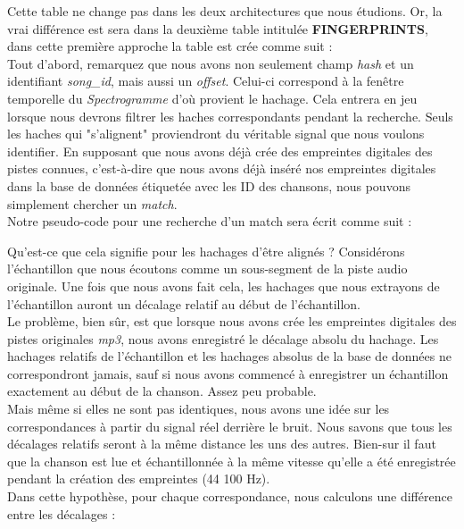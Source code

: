 \documentclass[11pt, report, french]{scrreprt}
\begin{document}


\vspace{0.5cm}
Cette table ne change pas dans les deux architectures que nous étudions. Or, la vrai différence est sera dans la deuxième table intitulée \textbf{FINGERPRINTS}, dans cette première approche la table est crée comme suit :\\



\vspace{0.5cm}
Tout d'abord, remarquez que nous avons non seulement champ \textit{hash} et un identifiant \textit{song\_id}, mais aussi un \textit{offset}. Celui-ci correspond à la fenêtre temporelle du \textit{Spectrogramme} d'où provient le hachage. Cela entrera en jeu lorsque nous devrons filtrer les haches correspondants pendant la recherche. Seuls les haches qui "s'alignent" proviendront du véritable signal que nous voulons identifier.
En supposant que nous avons déjà crée des empreintes digitales des pistes connues, c'est-à-dire que nous avons déjà inséré nos empreintes digitales dans la base de données étiquetée avec les ID des chansons, nous pouvons simplement chercher un \textit{match}.\\

Notre pseudo-code pour une recherche d'un match sera écrit comme suit :



\vspace{0.5cm}
Qu'est-ce que cela signifie pour les hachages d'être alignés ? Considérons l'échantillon que nous écoutons comme un sous-segment de la piste audio originale. Une fois que nous avons fait cela, les hachages que nous extrayons de l'échantillon auront un décalage relatif au début de l'échantillon.\\

Le problème, bien sûr, est que lorsque nous avons crée les empreintes digitales des pistes originales \textit{mp3}, nous avons enregistré le décalage absolu du hachage. Les hachages relatifs de l'échantillon et les hachages absolus de la base de données ne correspondront jamais, sauf si nous avons commencé à enregistrer un échantillon exactement au début de la chanson. Assez peu probable.\\

Mais même si elles ne sont pas identiques, nous avons une idée sur les correspondances à partir du signal réel derrière le bruit. Nous savons que tous les décalages relatifs seront à la même distance les uns des autres. Bien-sur il faut que la chanson est lue et échantillonnée à la même vitesse qu'elle a été enregistrée pendant la création des empreintes (44 100 Hz).\\
Dans cette hypothèse, pour chaque correspondance, nous calculons une différence entre les décalages :\\
\end{document}

